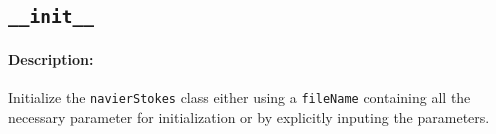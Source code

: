 
\newpage

\subsection{\texttt{\_\_init\_\_}}
	\paragraph{Description:} Initialize the \texttt{navierStokes} class either using a \texttt{fileName} containing all the necessary parameter for initialization or by explicitly inputing the parameters.\\

